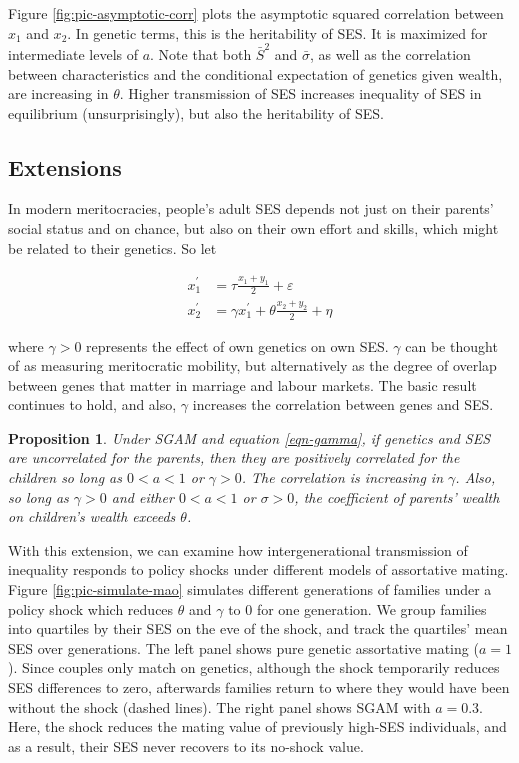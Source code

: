 \documentclass[
]{article}
\newtheorem{proposition}{Proposition}
\theoremstyle{definition}
\theoremstyle{definition}
\theoremstyle{definition}
\theoremstyle{definition}
\theoremstyle{remark}
\begin{document}
Figure \ref{fig:pic-asymptotic-corr} plots the asymptotic squared correlation
between \(x_1\) and \(x_2\). In genetic terms, this is the heritability of SES. It is
maximized for intermediate levels of \(a\). Note that both \(\bar{S}^{2}\) and
\(\bar{\sigma}\), as well as the correlation between characteristics and the
conditional expectation of genetics given wealth, are increasing in \(\theta\).
Higher transmission of SES increases inequality of SES in equilibrium
(unsurprisingly), but also the heritability of SES.

\subsection{Extensions}\label{extensions}

In modern meritocracies, people's adult SES depends not just
on their parents' social status and on chance, but also on their own effort and
skills, which might be related to their genetics. So let

\begin{align}
x^\prime_1 &= \tau \frac{x_{1} + y_{1}}{2} + \varepsilon   \nonumber \\
x^\prime_2 &= \gamma x^\prime_1 + \theta \frac{x_{2}+y_{2}}{2}+\eta \label{eqn-gamma}
\end{align}

where \(\gamma > 0\) represents the effect of own genetics on own SES. \(\gamma\)
can be thought of as measuring meritocratic mobility, but alternatively as the
degree of overlap between genes that matter in marriage and labour
markets. The basic result continues to hold, and also, \(\gamma\)
increases the correlation between genes and SES.

\begin{proposition}\label{prop-gamma}
Under SGAM and equation \eqref{eqn-gamma}, if genetics and SES are 
uncorrelated for the parents, then they
are positively correlated for the children so long as $0 < a < 1$ or
$\gamma > 0$. The correlation is increasing in $\gamma$. Also, so 
long as $\gamma > 0$ and either $0 < a < 1$ or $\sigma > 0$, the coefficient 
of parents' wealth on children's wealth exceeds $\theta$.
\end{proposition}

With this extension, we can examine how intergenerational transmission
of inequality responds to policy shocks under different models of assortative
mating. Figure \ref{fig:pic-simulate-mao} simulates different generations of
families under a policy shock which reduces \(\theta\) and \(\gamma\) to 0 for
one generation. We group families into quartiles by their SES on the eve of the
shock, and track the quartiles' mean SES over generations. The left panel shows
pure genetic assortative mating (\(a = 1\)). Since couples only match on genetics,
although the shock temporarily reduces SES differences to zero, afterwards
families return to where they would have been without the shock
(dashed lines). The right panel shows SGAM with \(a = 0.3\). Here, the shock
reduces the mating value of previously high-SES individuals, and as a result,
their SES never recovers to its no-shock value.
\end{document}
